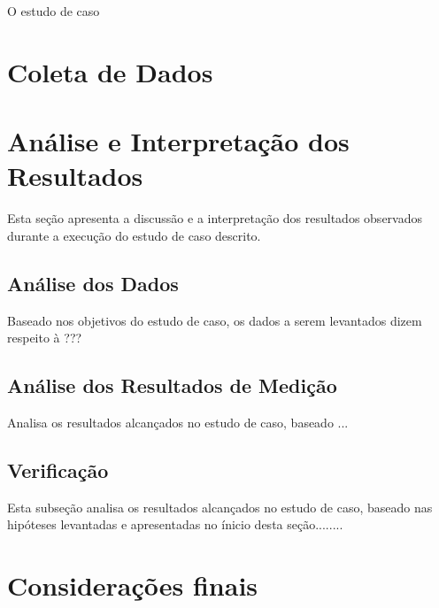 O estudo de caso

\section{Coleta de Dados}


\section{Análise e Interpretação dos Resultados}

Esta seção apresenta a discussão e a interpretação dos resultados observados durante a execução do estudo de caso descrito.

\subsection{Análise dos Dados}

Baseado nos objetivos do estudo de caso, os dados a serem levantados dizem respeito à ???

\subsection{Análise dos Resultados de Medição}

Analisa os resultados alcançados no estudo de caso, baseado ...

\subsection{Verificação}

Esta subseção analisa os resultados alcançados no estudo de caso, baseado nas hipóteses levantadas e apresentadas no ínicio desta seção........


\section{Considerações finais}








